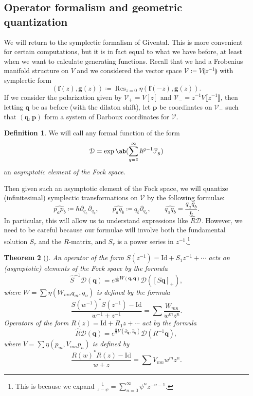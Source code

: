 \documentclass[10pt]{amsart}
\newtheorem{thm}{Theorem}[section]
\theoremstyle{definition}
\newtheorem{defn}[thm]{Definition}
\theoremstyle{remark}
\theoremstyle{plain}
\theoremstyle{definition}
\theoremstyle{remark}
\newcommand{\mc}[1]{\mathcal{#1}}
\newcommand{\mbf}[1]{\mathbf{#1}}
\newcommand{\bq}{\mbf{q}}
\newcommand{\bp}{\mbf{p}}
\newcommand{\mr}[1]{\mathrm{#1}}
\newcommand{\on}[1]{\operatorname{#1}}
\newcommand{\wh}[1]{\widehat{#1}}
\newcommand{\1}{\mathbf{1}}
\newcommand{\2}{\mathbf{2}}
\newcommand{\3}{\mathbf{3}}
\newcommand{\ps}[1]{\llbracket #1 \rrbracket}
\newcommand{\ls}[1]{\llparenthesis #1 \rrparenthesis}
\begin{document}
\subsection{Operator formalism and geometric quantization}%
\label{sub:Operator formalism and geometric quantization}

We will return to the symplectic formalism of Givental. This is more convenient for certain computations, but it is in fact equal to what we have before, at least when we want to calculate generating functions. Recall that we had a Frobenius manifold structure on $V$ and we considered the vector space $\mc{V}\coloneqq V\ls{z^{-1}}$ with symplectic form
\[ (\mbf{f}(z), \mbf{g}(z)) \coloneqq \on{Res}_{z=0} \eta(\mbf{f}(-z), \mbf{g}(z)). \]
If we consider the polarization given by $\mc{V}_+ = V[z]$ and $\mc{V}_- = z^{-1}V\ps{z^{-1}}$, then letting $\bq$ be as before (with the dilaton shift), let $\bp$ be coordinates on $\mc{V}_-$ such that $(\bq, \bp)$ form a system of Darboux coordinates for $\mc{V}$.

\begin{defn}
    We will call any formal function of the form
    \[ \mc{D} = \exp\ab(\sum_{g=0}^{\infty} \hbar^{g-1} \mc{F}_g) \]
    an \textit{asymptotic element of the Fock space}.
\end{defn}

Then given such an asymptotic element of the Fock space, we will quantize (infinitesimal) symplectic transformations on $\mc{V}$ by the following formulae:
\[ \wh{p_a p_b} \coloneqq \hbar \partial_{q_a} \partial_{q_b}, \qquad \wh{p_a q_b} \coloneqq q_b \partial_{q_a}, \qquad \wh{q_a q_b} = \frac{q_a q_b}{\hbar}. \]
In particular, this will allow us to understand expressions like $\hat{R} \mc{D}$. However, we need to be careful because our formulae will involve both the fundamental solution $S_{\tau}$ and the $R$-matrix, and $S_{\tau}$ is a power series in $z^{-1}$.\footnote{This is because we expand $\frac{1}{z-\psi} = \sum_{n=0}^{\infty} \psi^n z^{-n-1}$.}

\begin{thm}[{\cite{virasorofanotoric}}]
    An operator of the form $S(z^{-1}) = \mr{Id} + S_1 z^{-1} + \cdots$ acts on (asymptotic) elements of the Fock space by the formula
    \[ \hat{S}^{-1} \mc{D}(\bq) = e^{\frac{1}{2\hbar}W(\bq,\bq)} \mc{D}([S \bq]_+), \]
    where $W = \sum \eta(W_{mn}q_m, q_n)$ is defined by the formula
    \[ \frac{S(w^{-1})^* S(z^{-1}) - \mr{Id}}{w^{-1}+z^{-1}} = \sum \frac{W_{mn}}{w^m z^n}. \]
    Operators of the form $R(z) = \mr{Id} + R_1 z + \cdots$ act by the formula
    \[ \hat{R}\mc{D}(\bq) = e^{\frac{\hbar}{2} V(\partial_{\bq}, \partial_{\bq})} \mc{D}(R^{-1} \bq), \]
    where $V = \sum \eta(p_m, V_{mn} p_n)$ is defined by 
    \[ \frac{R(w)^* R(z) - \mr{Id}}{w+z} = \sum V_{mn} w^m z^n. \]
\end{thm}
\end{document}
